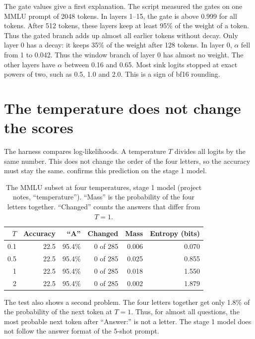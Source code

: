 The gate values give a first explanation. The script measured the gates on one MMLU prompt of 2048 tokens. In layers 1--15, the gate is above 0.999 for all tokens. After 512 tokens, these layers keep at least 95\% of the weight of a token. Thus the gated branch adds up almost all earlier tokens without decay. Only layer 0 has a decay: it keeps 35\% of the weight after 128 tokens. In layer 0, $\alpha$ fell from 1 to 0.042. Thus the window branch of layer 0 has almost no weight. The other layers have $\alpha$ between 0.16 and 0.65. Most sink logits stopped at exact powers of two, such as 0.5, 1.0 and 2.0. This is a sign of bf16 rounding.

\section{The temperature does not change the scores}
\label{sec:temperature}

The harness compares log-likelihoods. A temperature $T$ divides all logits by the same number. This does not change the order of the four letters, so the accuracy must stay the same.  confirms this prediction on the stage 1 model.

\begin{table}[ht]
\centering
\small
\caption[The MMLU subset at four temperatures]{The MMLU subset at four temperatures, stage 1 model (project notes, \enquote{temperature}). \enquote{Mass} is the probability of the four letters together. \enquote{Changed} counts the answers that differ from $T = 1$.}
\label{tab:temperature}
\begin{tabular}{@{}rrrrrr@{}}
\toprule
$T$ & Accuracy & \enquote{A} & Changed & Mass & Entropy (bits) \\
\midrule
0.1 & 22.5 & 95.4\% & 0 of 285 & 0.006 & 0.070 \\
0.5 & 22.5 & 95.4\% & 0 of 285 & 0.025 & 0.855 \\
1 & 22.5 & 95.4\% & 0 of 285 & 0.018 & 1.550 \\
2 & 22.5 & 95.4\% & 0 of 285 & 0.002 & 1.879 \\
\bottomrule
\end{tabular}
\end{table}

The test also shows a second problem. The four letters together get only 1.8\% of the probability of the next token at $T = 1$. Thus, for almost all questions, the most probable next token after \enquote{Answer:} is not a letter. The stage 1 model does not follow the answer format of the 5-shot prompt.

